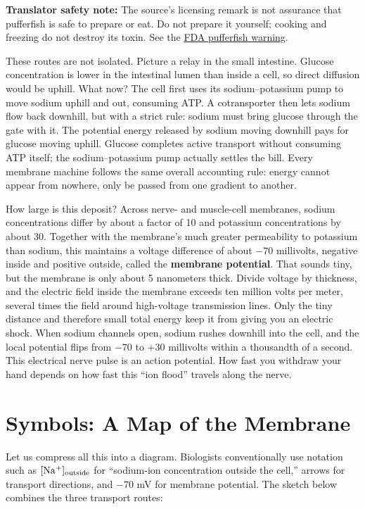 \textbf{Translator safety note:} The source's licensing remark is not assurance that pufferfish is safe to prepare or eat. Do not prepare it yourself; cooking and freezing do not destroy its toxin. See the \href{https://www.accessdata.fda.gov/cms_ia/importalert_37.html}{FDA pufferfish warning}.

These routes are not isolated. Picture a relay in the small intestine. Glucose concentration is lower in the intestinal lumen than inside a cell, so direct diffusion would be uphill. What now? The cell first uses its sodium--potassium pump to move sodium uphill and out, consuming ATP. A cotransporter then lets sodium flow back downhill, but with a strict rule: sodium must bring glucose through the gate with it. The potential energy released by sodium moving downhill pays for glucose moving uphill. Glucose completes active transport without consuming ATP itself; the sodium--potassium pump actually settles the bill. Every membrane machine follows the same overall accounting rule: energy cannot appear from nowhere, only be passed from one gradient to another.

\begin{qiaoliang}
How large is this deposit? Across nerve- and muscle-cell membranes, sodium concentrations differ by about a factor of 10 and potassium concentrations by about 30. Together with the membrane's much greater permeability to potassium than sodium, this maintains a voltage difference of about $-70$ millivolts, negative inside and positive outside, called the \textbf{membrane potential}. That sounds tiny, but the membrane is only about 5 nanometers thick. Divide voltage by thickness, and the electric field inside the membrane exceeds ten million volts per meter, several times the field around high-voltage transmission lines. Only the tiny distance and therefore small total energy keep it from giving you an electric shock. When sodium channels open, sodium rushes downhill into the cell, and the local potential flips from $-70$ to $+30$ millivolts within a thousandth of a second. This electrical nerve pulse is an action potential. How fast you withdraw your hand depends on how fast this ``ion flood'' travels along the nerve.
\end{qiaoliang}

\section{Symbols: A Map of the Membrane}

Let us compress all this into a diagram. Biologists conventionally use notation such as $[\mathrm{Na^+}]_{\text{outside}}$ for ``sodium-ion concentration outside the cell,'' arrows for transport directions, and $-70$ mV for membrane potential. The sketch below combines the three transport routes:

